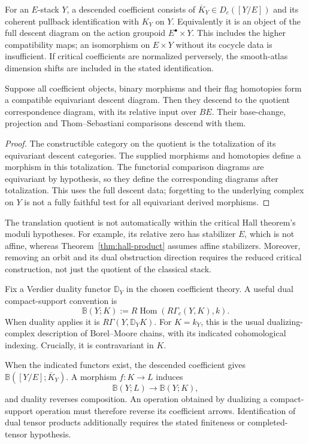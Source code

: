 For an $E$-stack $Y$, a descended coefficient consists of
$\overline K_Y\in D_c([Y/E])$ and its coherent pullback
identification with $K_Y$ on $Y$. Equivalently it is an object
of the full descent diagram on the action groupoid
$E^\bullet\times Y$. This includes the higher compatibility
maps; an isomorphism on $E\times Y$ without its cocycle data is
insufficient. If critical coefficients are normalized perversely,
the smooth-atlas dimension shifts are included in the stated
identification.

\begin{proposition}
\label{prop:quotient-after-correspondence-preserves-thom-sebastiani}
Suppose all coefficient objects, binary morphisms and their flag
homotopies form a compatible equivariant descent diagram.
Then they descend to the quotient correspondence diagram, with
its relative input over $BE$. Their base-change, projection and
Thom--Sebastiani comparisons descend with them.
\end{proposition}

\begin{proof}
The constructible category on the quotient is the totalization
of its equivariant descent categories. The supplied morphisms and
homotopies define a morphism in this totalization. The functorial
comparison diagrams are equivariant by hypothesis, so they define
the corresponding diagrams after totalization. This uses the
full descent data; forgetting to the underlying complex on $Y$
is not a fully faithful test for all equivariant derived morphisms.
\end{proof}

The translation quotient is not automatically within the
critical Hall theorem's moduli hypotheses. For example, its
relative zero has stabilizer $E$, which is not affine, whereas
Theorem~\ref{thm:hall-product} assumes affine stabilizers.
Moreover, removing an orbit and its dual obstruction direction
requires the reduced critical construction, not just the quotient
of the classical stack.

Fix a Verdier duality functor $\mathbb D_Y$ in the chosen
coefficient theory. A useful dual compact-support convention is
\[
 \mathbb B(Y;K):=R\operatorname{Hom}(R\Gamma_c(Y,K),k).
\]
When duality applies it is $R\Gamma(Y,\mathbb D_YK)$.
For $K=k_Y$, this is the usual dualizing-complex description of
Borel--Moore chains, with its indicated cohomological indexing.
Crucially, it is contravariant in $K$.

\begin{proposition}
\label{prop:quotient-after-correspondence-borel-moore-chain-functor}
When the indicated functors exist, the descended coefficient gives
$\mathbb B([Y/E];\overline K_Y)$. A morphism $f:K\to L$ induces
\[
 \mathbb B(Y;L)\longrightarrow\mathbb B(Y;K),
\]
and duality reverses composition. An operation obtained by dualizing a
compact-support operation must therefore reverse its coefficient
arrows. Identification of dual tensor products additionally
requires the stated finiteness or completed-tensor hypothesis.
\end{proposition}

